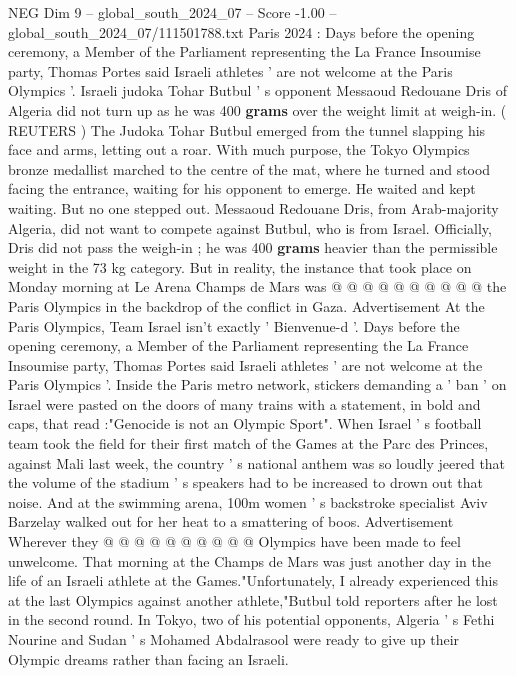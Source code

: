 \begin{textsample}{NEG Dim 9 – global\_south\_2024\_07 – Score -1.00 – global\_south\_2024\_07/111501788.txt}  \label{ex:f9_neg_354}
Paris 2024 : Days before the opening ceremony, a Member of the Parliament representing the La France Insoumise party, Thomas Portes said Israeli athletes ' are not welcome at the Paris Olympics '.
Israeli judoka Tohar Butbul ' s opponent Messaoud Redouane Dris of Algeria did not turn up as he was 400 \textbf{grams} over the weight limit at weigh-in. ( REUTERS ) The Judoka Tohar Butbul emerged from the tunnel slapping his face and arms, letting out a roar.
With much purpose, the Tokyo Olympics bronze medallist marched to the centre of the mat, where he turned and stood facing the entrance, waiting for his opponent to emerge.
He waited and kept waiting.
But no one stepped out.
Messaoud Redouane Dris, from Arab-majority Algeria, did not want to compete against Butbul, who is from Israel.
Officially, Dris did not pass the weigh-in ; he was 400 \textbf{grams} heavier than the permissible weight in the 73 kg category.
But in reality, the instance that took place on Monday morning at Le Arena Champs de Mars was @ @ @ @ @ @ @ @ @ @ the Paris Olympics in the backdrop of the conflict in Gaza.
Advertisement At the Paris Olympics, Team Israel isn't exactly ' Bienvenue-d '.
Days before the opening ceremony, a Member of the Parliament representing the La France Insoumise party, Thomas Portes said Israeli athletes ' are not welcome at the Paris Olympics '.
Inside the Paris metro network, stickers demanding a ' ban ' on Israel were pasted on the doors of many trains with a statement, in bold and caps, that read :"Genocide is not an Olympic Sport".
When Israel ' s football team took the field for their first match of the Games at the Parc des Princes, against Mali last week, the country ' s national anthem was so loudly jeered that the volume of the stadium ' s speakers had to be increased to drown out that noise.
And at the swimming arena, 100m women ' s backstroke specialist Aviv Barzelay walked out for her heat to a smattering of boos.
Advertisement Wherever they @ @ @ @ @ @ @ @ @ @ Olympics have been made to feel unwelcome.
That morning at the Champs de Mars was just another day in the life of an Israeli athlete at the Games."Unfortunately, I already experienced this at the last Olympics against another athlete,"Butbul told reporters after he lost in the second round.
In Tokyo, two of his potential opponents, Algeria ' s Fethi Nourine and Sudan ' s Mohamed Abdalrasool were ready to give up their Olympic dreams rather than facing an Israeli.

\end{textsample}
